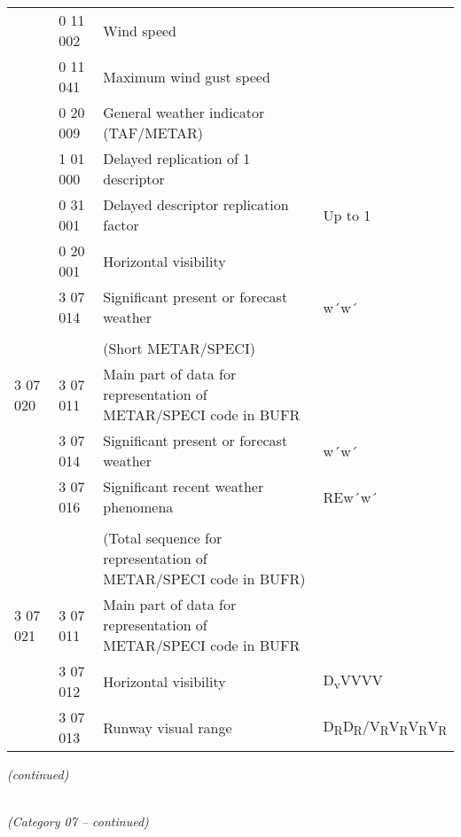 \begin{longtable}[]{@{}llll@{}}
& 0 11 002 & Wind speed &\tabularnewline
& 0 11 041 & Maximum wind gust speed &\tabularnewline
& 0 20 009 & General weather indicator (TAF/METAR) &\tabularnewline
& 1 01 000 & Delayed replication of 1 descriptor &\tabularnewline
& 0 31 001 & Delayed descriptor replication factor & Up to 1\tabularnewline
& 0 20 001 & Horizontal visibility &\tabularnewline
& 3 07 014 & Significant present or forecast weather & w´w´\tabularnewline
& & &\tabularnewline
& & (Short METAR/SPECI) &\tabularnewline
3 07 020 & 3 07 011 & Main part of data for representation of METAR/SPECI code in BUFR &\tabularnewline
& 3 07 014 & Significant present or forecast weather & w´w´\tabularnewline
& 3 07 016 & Significant recent weather phenomena & REw´w´\tabularnewline
& & &\tabularnewline
& & (Total sequence for representation of METAR/SPECI code in BUFR) &\tabularnewline
3 07 021 & 3 07 011 & Main part of data for representation of METAR/SPECI code in BUFR &\tabularnewline
& 3 07 012 & Horizontal visibility & D\textsubscript{v}VVVV\tabularnewline
& 3 07 013 & Runway visual range & D\textsubscript{R}D\textsubscript{R}/V\textsubscript{R}V\textsubscript{R}V\textsubscript{R}V\textsubscript{R}\tabularnewline
\bottomrule
\end{longtable}

\emph{(continued)}

\emph{\\
(Category 07 -- continued)}

